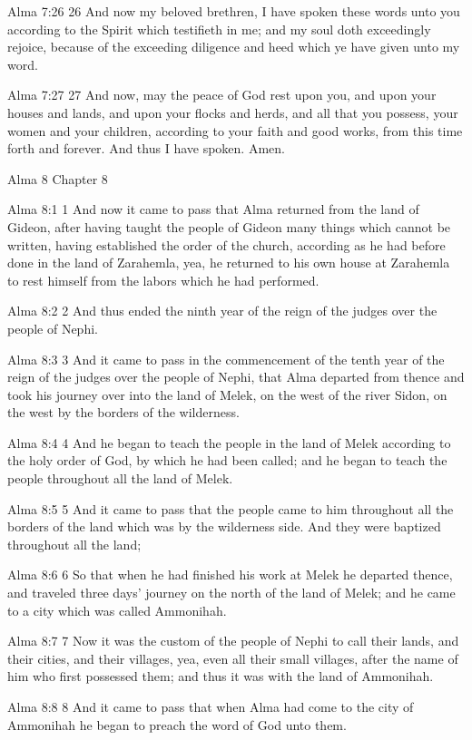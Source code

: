 Alma 7:26
 26 And now my beloved brethren, I have spoken these words unto
you according to the Spirit which testifieth in me; and my soul
doth exceedingly rejoice, because of the exceeding diligence and
heed which ye have given unto my word.

Alma 7:27
 27 And now, may the peace of God rest upon you, and upon your
houses and lands, and upon your flocks and herds, and all that
you possess, your women and your children, according to your
faith and good works, from this time forth and forever. And thus
I have spoken. Amen.

Alma 8
Chapter 8

Alma 8:1
 1 And now it came to pass that Alma returned from the land of
Gideon, after having taught the people of Gideon many things
which cannot be written, having established the order of the
church, according as he had before done in the land of Zarahemla,
yea, he returned to his own house at Zarahemla to rest himself
from the labors which he had performed.

Alma 8:2
 2 And thus ended the ninth year of the reign of the judges over
the people of Nephi.

Alma 8:3
 3 And it came to pass in the commencement of the tenth year of
the reign of the judges over the people of Nephi, that Alma
departed from thence and took his journey over into the land of
Melek, on the west of the river Sidon, on the west by the borders
of the wilderness.

Alma 8:4
 4 And he began to teach the people in the land of Melek
according to the holy order of God, by which he had been called;
and he began to teach the people throughout all the land of
Melek.

Alma 8:5
 5 And it came to pass that the people came to him throughout all
the borders of the land which was by the wilderness side. And
they were baptized throughout all the land;

Alma 8:6
 6 So that when he had finished his work at Melek he departed
thence, and traveled three days' journey on the north of the land
of Melek; and he came to a city which was called Ammonihah.

Alma 8:7
 7 Now it was the custom of the people of Nephi to call their
lands, and their cities, and their villages, yea, even all their
small villages, after the name of him who first possessed them;
and thus it was with the land of Ammonihah.

Alma 8:8
 8 And it came to pass that when Alma had come to the city of
Ammonihah he began to preach the word of God unto them.

